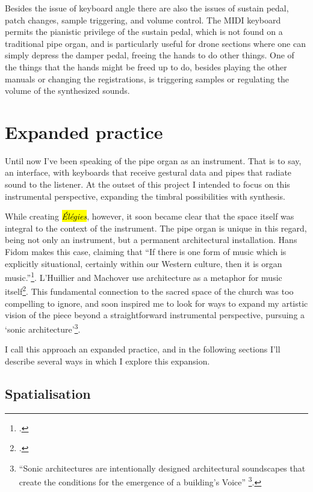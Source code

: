 \documentclass[12pt,twoside,maitrise]{dms_ks}
\theoremstyle{definition}
\begin{document}
{Besides the issue of keyboard angle there are also the issues of sustain pedal, patch changes, sample triggering, and volume control. 
The MIDI keyboard permits the pianistic privilege of the sustain pedal, which is not found on a traditional pipe organ, and is particularly useful for drone sections where one can simply depress the damper pedal, freeing the hands to do other things. 
One of the things that the hands might be freed up to do, besides playing the other manuals or changing the registrations, is triggering samples or regulating the volume of the synthesized sounds. 

\section{Expanded practice}

Until now I've been speaking of the pipe organ as an instrument. 
That is to say, an interface, with keyboards that receive gestural data and pipes that radiate sound to the listener. 
At the outset of this project I intended to focus on this instrumental perspective, expanding the timbral possibilities with synthesis.

While creating \hl{\textit{Élégies}}, however, it soon became clear that the space itself was integral to the context of the instrument. 
The pipe organ is unique in this regard, being not only an instrument, but a permanent architectural installation. 
Hans Fidom makes this case, claiming that “If there is one form of music which is explicitly situational, certainly within our Western culture, then it is organ music.”\footcite[23]{fidom_music_2012}. 
L'Huillier and Machover use architecture as a metaphor for music itself\footcite[361]{lhuillier_spaces_2018}. 
This fundamental connection to the sacred space of the church was too compelling to ignore, and soon inspired me to look for ways to expand my artistic vision of the piece beyond a straightforward instrumental perspective, pursuing a `sonic architecture'\footnote{“Sonic architectures are intentionally designed architectural soundscapes that create the conditions for the emergence of a building’s Voice” \footcite[2]{lacey_site-specific_2014}.}.

I call this approach an expanded practice, and in the following sections I'll describe several ways in which I explore this expansion.

\subsection{Spatialisation}

}
\end{document}
